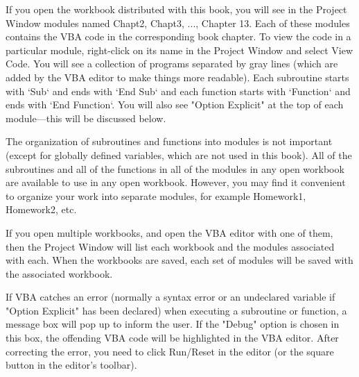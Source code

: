 If you open the workbook distributed with this book, you will see in the
Project Window modules named Chapt2, Chapt3, ..., Chapter 13. Each of
these modules contains the VBA code in the corresponding book chapter.
To view the code in a particular module, right-click on its name in the
Project Window and select View Code. You will see a collection of
programs separated by gray lines (which are added by the VBA editor to
make things more readable). Each subroutine starts with `Sub` and ends
with `End Sub` and each function starts with `Function` and ends with
`End Function`. You will also see "Option Explicit" at the top of each
module---this will be discussed below.

The organization of subroutines and functions into modules is not important (except for globally defined variables, which are not used in this book).  All of the subroutines and all of the functions in all of the modules in any open workbook are available to use in any open workbook.  However, you may find it convenient to organize your work into separate modules, for example Homework1, Homework2, etc. 

If you open multiple workbooks, and open the VBA editor with one of them, then the Project Window will list each workbook and the modules associated with each.  When the workbooks are saved, each set of modules will be saved with the associated workbook.  

If VBA catches an error (normally a syntax error or an undeclared
variable if "Option Explicit" has been declared) when executing a
subroutine or function, a message box will pop up to inform the user. If
the "Debug" option is chosen in this box, the offending VBA code will be
highlighted in the VBA editor. After correcting the error, you need to
click Run/Reset in the editor (or the square button in the editor's
toolbar).

